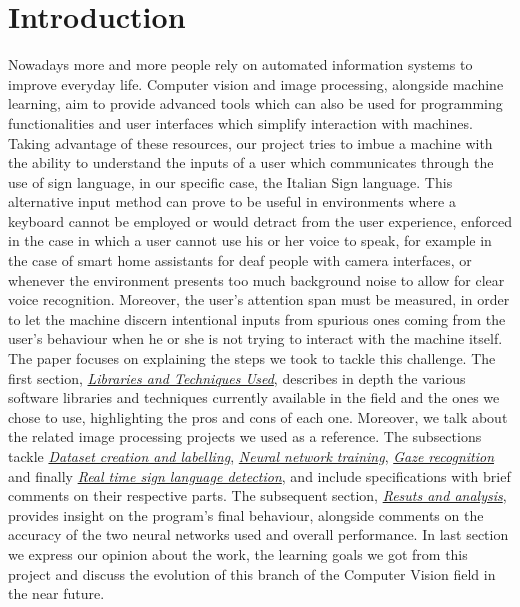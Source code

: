 \documentclass[a4paper, 12pt]{article}
\begin{document}
\section{Introduction}
\label{Introduction}
Nowadays more and more people rely on automated information systems to improve everyday life.
Computer vision and image processing, alongside machine learning, aim to provide advanced tools which can also be used for programming functionalities and user interfaces which simplify interaction with machines.
Taking advantage of these resources, our project tries to imbue a machine with the ability to understand the inputs of a user which communicates through the use of sign language, in our specific case, the Italian Sign language. This alternative input method can prove to be useful in environments where a keyboard cannot be employed or would detract from the user experience, enforced in the case in which a user cannot use his or her voice to speak, for example in the case of smart home assistants for deaf people with camera interfaces, or whenever the environment presents too much background noise to allow for clear voice recognition. Moreover, the user's attention span must be measured, in order to let the machine discern intentional inputs from spurious ones coming from the user's behaviour when he or she is not trying to interact with the machine itself.
The paper focuses on explaining the steps we took to tackle this challenge. The first section, \textit{\hyperref[LibsAndTech]{Libraries and Techniques Used}}, describes in depth the various software libraries and techniques currently available in the field and the ones we chose to use, highlighting the pros and cons of each one. Moreover, we talk about the related image processing projects we used as a reference.\linebreak
The subsections tackle \textit{\hyperref[DatasetCreationLabel]{Dataset creation and labelling}}, \textit{\hyperref[NeuralNetworkTraining]{Neural network training}}, \textit{\hyperref[GazeRec]{Gaze recognition}} and finally \textit{\hyperref[RTSignDetect]{Real time sign language detection}}, and include specifications with brief comments on their respective parts.\linebreak
The subsequent section, \textit{\hyperref[ResutsAndAnalysis]{Resuts and analysis}}, provides insight on the program's final behaviour, alongside comments on the accuracy of the two neural networks used and overall performance.
In last section we express our opinion about the work, the learning goals we got from this project and discuss the evolution of this branch of the Computer Vision field in the near future.\linebreak
\end{document}
